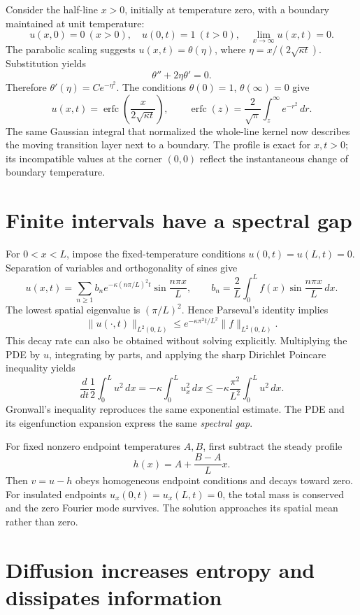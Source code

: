 Consider the half-line \(x>0\), initially at temperature zero, with a boundary maintained at unit temperature:
\[
 u(x,0)=0\ (x>0),\quad u(0,t)=1\ (t>0),\quad
 \lim_{x\to\infty}u(x,t)=0.
\]
The parabolic scaling suggests \(u(x,t)=\theta(\eta)\), where \(\eta=x/(2\sqrt{\kappa t})\). Substitution yields
\[
 \theta''+2\eta\theta'=0.
\]
Therefore \(\theta'(\eta)=Ce^{-\eta^2}\). The conditions
\(\theta(0)=1\), \(\theta(\infty)=0\) give
\[
 \boxed{u(x,t)=\operatorname{erfc}
       \left(\frac{x}{2\sqrt{\kappa t}}\right),\qquad
 \operatorname{erfc}(z)=\frac2{\sqrt\pi}\int_z^\infty e^{-r^2}\,dr.}
\]
The same Gaussian integral that normalized the whole-line kernel now describes the moving transition layer next to a boundary. The profile is exact for \(x,t>0\); its incompatible values at the corner \((0,0)\) reflect the instantaneous change of boundary temperature.

\section{Finite intervals have a spectral gap}

For \(0<x<L\), impose the fixed-temperature conditions \(u(0,t)=u(L,t)=0\). Separation of variables and orthogonality of sines give
\[
 u(x,t)=\sum_{n\ge1}b_ne^{-\kappa(n\pi/L)^2t}
                    \sin\frac{n\pi x}{L},\qquad
 b_n=\frac2L\int_0^Lf(x)\sin\frac{n\pi x}{L}\,dx.
\]
The lowest spatial eigenvalue is \((\pi/L)^2\). Hence Parseval's identity implies
\[
 \boxed{\|u(\cdot,t)\|_{L^2(0,L)}
       \le e^{-\kappa\pi^2t/L^2}\|f\|_{L^2(0,L)}.}
\]
This decay rate can also be obtained without solving explicitly. Multiplying the PDE by \(u\), integrating by parts, and applying the sharp Dirichlet Poincare inequality yields
\[
 \frac d{dt}\frac12\int_0^L u^2\,dx
 =-\kappa\int_0^L u_x^2\,dx
 \le-\kappa\frac{\pi^2}{L^2}\int_0^Lu^2\,dx.
\]
Gronwall's inequality reproduces the same exponential estimate. The PDE and its eigenfunction expansion express the same \emph{spectral gap}.

For fixed nonzero endpoint temperatures \(A,B\), first subtract the steady profile
\[
 h(x)=A+\frac{B-A}{L}x.
\]
Then \(v=u-h\) obeys homogeneous endpoint conditions and decays toward zero. For insulated endpoints \(u_x(0,t)=u_x(L,t)=0\), the total mass is conserved and the zero Fourier mode survives. The solution approaches its spatial mean rather than zero.

\section{Diffusion increases entropy and dissipates information}

